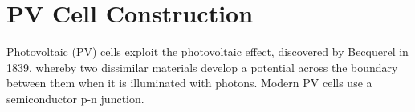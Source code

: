 \documentclass[class=scrartcl, crop=false,parskip=half,]{standalone}
\begin{document}
\section{PV Cell Construction}
Photovoltaic (PV) cells exploit the photovoltaic effect, discovered by Becquerel in 1839, whereby two dissimilar materials develop a potential across the boundary between them when it is illuminated with photons.
Modern PV cells use a semiconductor p-n junction.
\end{document}
